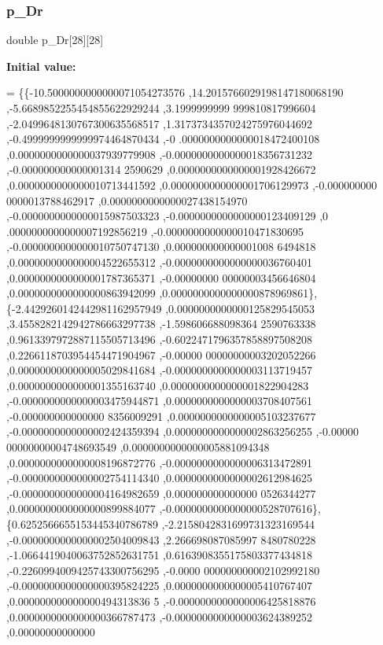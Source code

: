 \subsubsection{\texorpdfstring{p\+\_\+\+Dr}{p\_Dr}}
{\footnotesize\ttfamily double p\+\_\+\+Dr\mbox{[}28\mbox{]}\mbox{[}28\mbox{]}}

{\bfseries Initial value\+:}
\begin{DoxyCode}
= \{\{-10.5000000000000071054273576 ,14.2015766029198147180068190 ,-5.6689852255454855622929244 ,3.1999999999
      999810817996604 ,-2.0499648130767300635568517 ,1.3173734357024275976044692 ,-0.4999999999999974464870434 ,-0
      .0000000000000018472400108 ,0.0000000000000037939779908 ,-0.0000000000000018356731232 ,-0.000000000000001314
      2590629 ,0.0000000000000001928426672 ,0.0000000000000010713441592 ,0.0000000000000001706129973 ,-0.000000000
      0000013788462917 ,0.0000000000000027438154970 ,-0.0000000000000015987503323 ,-0.0000000000000000123409129 ,0
      .0000000000000007192856219 ,-0.0000000000000010471830695 ,-0.0000000000000010750747130 ,0.000000000000001008
      6494818 ,0.0000000000000004522655312 ,-0.0000000000000000036760401 ,0.0000000000000001787365371 ,-0.00000000
      00000003456646804 ,0.0000000000000000863942099 ,0.0000000000000000878969861\},
\{-2.4429260142442981162957949 ,0.0000000000000125829545053 ,3.4558282142942786663297738 ,-1.598606688098364
      2590763338 ,0.9613397972887115505713496 ,-0.6022471796357858897508208 ,0.2266118703954454471904967 ,-0.00000
      00000000003202052266 ,0.0000000000000005029841684 ,-0.0000000000000003113719457 ,0.0000000000000001355163740
       ,0.0000000000000001822904283 ,-0.0000000000000003475944871 ,0.0000000000000003708407561 ,-0.000000000000000
      8356009291 ,0.0000000000000005103237677 ,-0.0000000000000002424359394 ,0.0000000000000002863256255 ,-0.00000
      00000000004748693549 ,0.0000000000000005881094348 ,0.0000000000000008196872776 ,-0.0000000000000006313472891
       ,-0.0000000000000002754114340 ,0.0000000000000002612984625 ,-0.0000000000000004164982659 ,0.000000000000000
      0526344277 ,0.0000000000000000899884077 ,-0.0000000000000000528707616\},
\{0.6252566655153445340786789 ,-2.2158042831699731323169544 ,-0.0000000000000002504009843 ,2.266698087085997
      8480780228 ,-1.0664419040063752852631751 ,0.6163908355175803377434818 ,-0.2260994009425743300756295 ,-0.0000
      000000000002102992180 ,-0.0000000000000000395824225 ,0.0000000000000005410767407 ,0.000000000000000494313836
      5 ,-0.0000000000000006425818876 ,0.0000000000000000366787473 ,-0.0000000000000003624389252 ,0.00000000000000

\end{DoxyCode}
